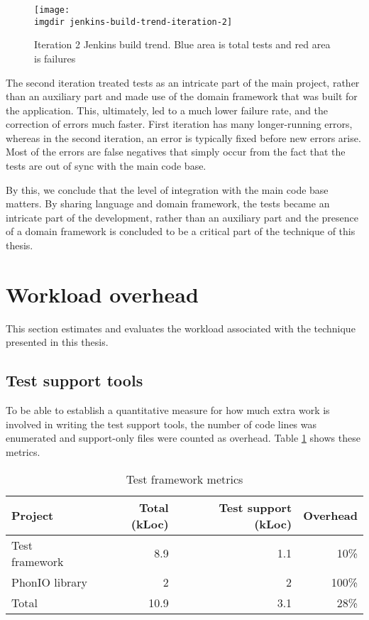 \begin{figure}[!hbpt]
\centering
\texttt{[image: \\imgdir jenkins-build-trend-iteration-2]}
\caption{Iteration 2 Jenkins build trend. Blue area is total tests and red area is failures}
\label{fig:jenkins-build-trend-iteration-2}
\end{figure}

\noindent The second iteration treated tests as an intricate part of the main project, rather than an auxiliary part and made use of the domain framework that was built for the application. This, ultimately, led to a much lower failure rate, and the correction of errors much faster. First iteration has many longer-running errors, whereas in the second iteration, an error is typically fixed before new errors arise. Most of the errors are false negatives that simply occur from the fact that the tests are out of sync with the main code base.\bigskip

\noindent By this, we conclude that the level of integration with the main code base matters. By sharing language and domain framework, the tests became an intricate part of the development, rather than an auxiliary part and the presence of a domain framework is concluded to be a critical part of the technique of this thesis.

\section{Workload overhead}
\label{sec:workload overhead}
This section estimates and evaluates the workload associated with the technique presented in this thesis.
\subsection{Test support tools}
To be able to establish a quantitative measure for how much extra work is involved in writing the test support tools, the number of code lines was enumerated and support-only files were counted as overhead. Table \ref{tab:loc-metrics} shows these metrics.\medskip

\begin{table}[!htbp]
\centering
\begin{tabular}{ | l | r | r | r |}
   \hline
   Project        & Total (kLoc) & Test support (kLoc) & Overhead \\ \hline
   Test framework & 8.9          & 1.1                 & 10\%     \\
   PhonIO library & 2            & 2                   & 100\%    \\
   \hline
   \hline
   Total          & 10.9         & 3.1                 & 28\%     \\
   \hline
\end{tabular}
\caption{Test framework metrics}
\label{tab:loc-metrics}
\end{table}

